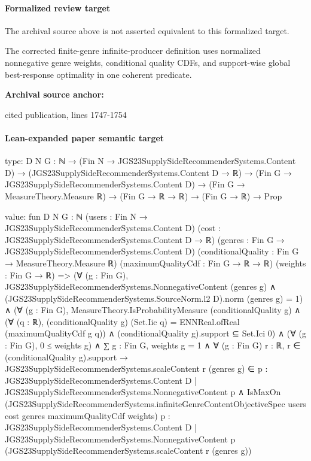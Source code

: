\documentclass[10pt]{article}
\begin{document}
\paragraph{Formalized review target}
The archival source above is not asserted equivalent to this formalized target.
\begin{ReviewVerbatim}
The corrected finite-genre infinite-producer definition uses normalized nonnegative genre weights, conditional quality CDFs, and support-wise global best-response optimality in one coherent predicate.
\end{ReviewVerbatim}

\textbf{Archival source anchor:} {\footnotesize\raggedright cited publication, lines 1747-\allowbreak{}1754\par}
\paragraph{Lean-expanded paper semantic target}
\begin{ReviewVerbatim}
type:
{D N G : ℕ} →
  (Fin N → JGS23SupplySideRecommenderSystems.Content D) →
    (JGS23SupplySideRecommenderSystems.Content D → ℝ) →
      (Fin G → JGS23SupplySideRecommenderSystems.Content D) →
        (Fin G → MeasureTheory.Measure ℝ) → (Fin G → ℝ → ℝ) → (Fin G → ℝ) → Prop

value:
fun {D N G : ℕ} (users : Fin N → JGS23SupplySideRecommenderSystems.Content D)
    (cost : JGS23SupplySideRecommenderSystems.Content D → ℝ)
    (genres : Fin G → JGS23SupplySideRecommenderSystems.Content D)
    (conditionalQuality : Fin G → MeasureTheory.Measure ℝ) (maximumQualityCdf : Fin G → ℝ → ℝ) (weights : Fin G → ℝ) =>
  (∀ (g : Fin G),
      JGS23SupplySideRecommenderSystems.NonnegativeContent (genres g) ∧
        (JGS23SupplySideRecommenderSystems.SourceNorm.l2 D).norm (genres g) = 1) ∧
    (∀ (g : Fin G),
        MeasureTheory.IsProbabilityMeasure (conditionalQuality g) ∧
          (∀ (q : ℝ), (conditionalQuality g) (Set.Iic q) = ENNReal.ofReal (maximumQualityCdf g q)) ∧
            (conditionalQuality g).support ⊆ Set.Ici 0) ∧
      (∀ (g : Fin G), 0 ≤ weights g) ∧
        ∑ g : Fin G, weights g = 1 ∧
          ∀ (g : Fin G) {{r : ℝ}},
            r ∈ (conditionalQuality g).support →
              JGS23SupplySideRecommenderSystems.scaleContent r (genres g) ∈
                  {p : JGS23SupplySideRecommenderSystems.Content D |
                    JGS23SupplySideRecommenderSystems.NonnegativeContent p} ∧
                IsMaxOn
                  (JGS23SupplySideRecommenderSystems.infiniteGenreContentObjectiveSpec users cost genres
                    maximumQualityCdf weights)
                  {p : JGS23SupplySideRecommenderSystems.Content D |
                    JGS23SupplySideRecommenderSystems.NonnegativeContent p}
                  (JGS23SupplySideRecommenderSystems.scaleContent r (genres g))
\end{ReviewVerbatim}
\end{document}
